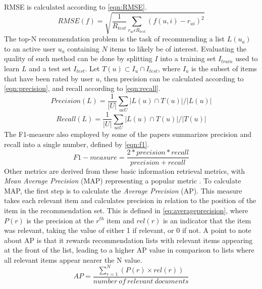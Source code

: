 RMSE is calculated according to \autoref{eqn:RMSE}.
\begin{equation}
    \label{eqn:RMSE}
    RMSE(f) = \sqrt{\frac{1}{R_{test}} \sum\limits_{r_{ui} \epsilon R_{test}} (f(u, i) - r_{ui})^2}
\end{equation}
The top-N recommendation problem is the task of recommending a list $L(u_a)$ to an active user $u_a$ containing $N$ items to likely be of interest.
Evaluating the quality of such method can be done by splitting $I$ into a training set $I_{train}$ used to learn $L$ and a test set $I_{test}$.
Let $T(u) \subset I_u \cap I_{test}$, where $I_u$ is the subset of items that have been rated by user $u$, then precision can be calculated according to \autoref{eqn:precision}, and recall according to \autoref{eqn:recall}.
\begin{equation}
    \label{eqn:precision}
    Precision(L) = \frac{1}{|U|} \sum\limits_{u \epsilon U} |L(u) \cap T(u)| / |L(u)|
\end{equation}
\begin{equation}
    \label{eqn:recall}
    Recall(L) = \frac{1}{|U|} \sum\limits_{u \epsilon U} |L(u) \cap T(u)| / |T(u)|
\end{equation}
The F1-measure also employed by some of the papers summarizes precision and recall into a single number, defined by \autoref{eqn:f1}.
\begin{equation}
    \label{eqn:f1}
    F1-measure = \frac{2*precision*recall}{precision+recall}
\end{equation}
Other metrics are derived from these basic information retrieval metrics, with \textit{Mean Average Precision} (MAP) representing a popular metric \cite{ChoosingMetricsEvaluation}.
To calculate MAP, the first step is to calculate the \textit{Average Precision} (AP).
This measure takes each relevant item and calculates precision in relation to the position of the item in the recommendation set.
This is defined in \autoref{eq:averageprecision}, where $P(r)$ is the precision at the $r^{th}$ item and $rel(r)$ is an indicator that the item was relevant, taking the value of either 1 if relevant, or 0 if not.
A point to note about AP is that it rewards recommendation lists with relevant items appearing at the front of the list, leading to a higher AP value in comparison to lists where all relevant items appear nearer the N value. 
\begin{equation}
    \label{eq:averageprecision}
    AP = \frac{\sum\limits_{r=1}^N (P(r) \times rel(r))}{number \: of \: relevant \: documents}
\end{equation}
